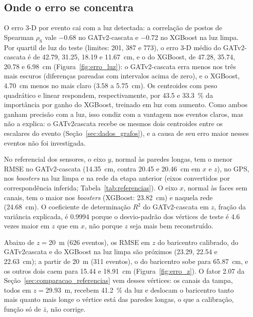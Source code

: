 \subsection{Onde o erro se concentra}
\label{sec:onde_erro}

O erro 3-D por evento cai com a luz detectada: a correlação de postos de Spearman $\rho_{\mathrm{S}}$ vale \num{-0.68} no GATv2-cascata e \num{-0.72} no XGBoost na luz limpa. Por quartil de luz do teste (limites: \num{201}, \num{387} e \qty{773}{\pe}), o erro 3-D médio do GATv2-cascata é de \num{42.79}, \num{31.25}, \num{18.19} e \qty{11.67}{\cm}, e o do XGBoost, de \num{47.28}, \num{35.74}, \num{20.78} e \qty{6.98}{\cm} (Figura~\ref{fig:erro_luz}): o GATv2-cascata erra menos nos três mais escuros (diferenças pareadas com intervalos acima de zero), e o XGBoost, \qty{4.70}{\cm} menos no mais claro (\num{3.58} a \qty{5.75}{\cm}). Os centroides com peso quadrático e linear respondem, respectivamente, por \num{43.5} e \qty{33.3}{\percent} da importância por ganho do XGBoost, treinado em luz com aumento. Como ambos ganham precisão com a luz, isso condiz com a vantagem nos eventos claros, mas não a explica: o GATv2\discretionary{-}{-}{-}cascata recebe os mesmos dois centroides entre os escalares do evento (Seção~\ref{sec:dados_grafos}), e a causa de seu erro maior nesses eventos não foi investigada.

No referencial dos sensores, o eixo $y$, normal às paredes longas, tem o menor RMSE no GATv2-cascata (\qty{14.35}{\cm}, contra \num{20.45} e \qty{20.46}{\cm} em $x$ e $z$), no GPS, nos \textit{boosters} na luz limpa e na rede da etapa anterior (eixos convertidos por correspondência inferida; Tabela~\ref{tab:referencias}). O eixo $x$, normal às faces sem canais, tem o maior nos \textit{boosters} (XGBoost: \qty{23.82}{\cm}) e naquela rede (\qty{24.68}{\cm}). O coeficiente de determinação $R^2$ do GATv2-cascata em $z$, fração da variância explicada, é \num{0.9994} porque o desvio-padrão dos vértices de teste é \num{4.6} vezes maior em $z$ que em $x$, não porque $z$ seja mais bem reconstruído.

Abaixo de $z = {}$\qty{20}{\m} (\num{626} eventos), os RMSE em $z$ do baricentro calibrado, do GATv2\discretionary{-}{-}{-}cascata e do XGBoost na luz limpa são próximos (\num{23.29}, \num{22.54} e \qty{22.63}{\cm}); a partir de \qty{20}{\m} (\num{311} eventos), o do baricentro sobe para \qty{65.87}{\cm}, e os outros dois caem para \num{15.44} e \qty{18.91}{\cm} (Figura~\ref{fig:erro_z}). O fator \num{2.07} da Seção~\ref{sec:comparacao_referencias} vem desses vértices: os canais da tampa, todos em $z = {}$\qty{29.93}{\m}, recebem \qty{41.2}{\percent} da luz e deslocam o baricentro tanto mais quanto mais longe o vértice está das paredes longas, o que a calibração, função só de $\bar{z}$, não corrige.

